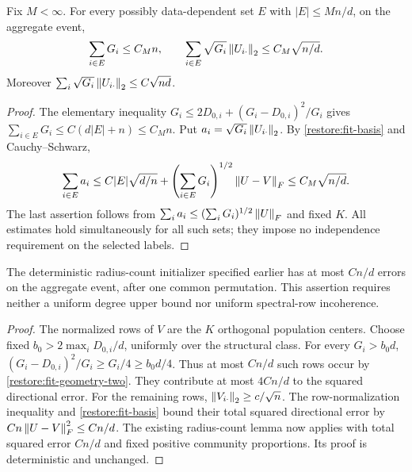 \begin{lemma}
\label{restore:fit-wrong-mass}
Fix $M<\infty$. For every possibly data-dependent set $E$ with
$|E|\le Mn/d$, on the aggregate event,
\begin{equation}\label{restore:fit-wrong-mass-bounds}
 \sum_{i\in E}G_i\le C_Mn,\qquad
 \sum_{i\in E}\sqrt{G_i}\left\lVert U_{i\cdot}\right\rVert_2
       \le C_M\sqrt{n/d}.
\end{equation}
Moreover
$\sum_i\sqrt{G_i}\left\lVert U_{i\cdot}\right\rVert_2\le C\sqrt{nd}$.
\end{lemma}

\begin{proof}
The elementary inequality
$G_i\le2D_{0,i}+(G_i-D_{0,i})^2/G_i$ gives
$\sum_{i\in E}G_i\le C(d|E|+n)\le C_Mn$.
Put $a_i=\sqrt{G_i}\left\lVert U_{i\cdot}\right\rVert_2$.
By \eqref{restore:fit-basis} and Cauchy--Schwarz,
\[
 \sum_{i\in E}a_i
 \le C|E|\sqrt{d/n}
      +\left(\sum_{i\in E}G_i\right)^{1/2}\left\lVert U-V\right\rVert_F
 \le C_M\sqrt{n/d}.
\]
The last assertion follows from
$\sum_i a_i\le(\sum_iG_i)^{1/2}\left\lVert U\right\rVert_F$ and fixed $K$.
All estimates hold simultaneously for all such sets; they impose no
independence requirement on the selected labels.
\end{proof}

\begin{lemma}
\label{restore:fit-initializer}
The deterministic radius-count initializer specified earlier has at most
$C n/d$ errors on the aggregate event, after one common permutation.
This assertion requires neither a uniform degree upper bound nor
uniform spectral-row incoherence.
\end{lemma}

\begin{proof}
The normalized rows of $V$ are the $K$ orthogonal population centers.
Choose fixed $b_0>2\max_iD_{0,i}/d$, uniformly over the structural class.
For every $G_i>b_0d$,
$(G_i-D_{0,i})^2/G_i\ge G_i/4\ge b_0d/4$.
Thus at most $Cn/d$ such rows occur by
\eqref{restore:fit-geometry-two}. They contribute at most $4Cn/d$
to the squared directional error. For the remaining rows,
$\left\lVert V_{i\cdot}\right\rVert_2\ge c/\sqrt n$. The row-normalization inequality
and \eqref{restore:fit-basis} bound their total squared directional
error by $Cn\left\lVert U-V\right\rVert_F^2\le Cn/d$.
The existing radius-count lemma now applies with total squared error
$Cn/d$ and fixed positive community proportions. Its proof is
deterministic and unchanged.
\end{proof}

